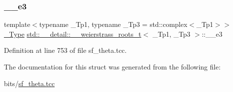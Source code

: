 \subsubsection{\texorpdfstring{\+\_\+\+\_\+e3}{\_\_e3}}
{\footnotesize\ttfamily template$<$typename \+\_\+\+Tp1, typename \+\_\+\+Tp3 = std\+::complex$<$\+\_\+\+Tp1$>$$>$ \\
\hyperlink{structstd_1_1____detail_1_1____weierstrass__roots__t_acda3e0386962aea322dea870977b67ed}{\+\_\+\+Type} \hyperlink{structstd_1_1____detail_1_1____weierstrass__roots__t}{std\+::\+\_\+\+\_\+detail\+::\+\_\+\+\_\+weierstrass\+\_\+roots\+\_\+t}$<$ \+\_\+\+Tp1, \+\_\+\+Tp3 $>$\+::\+\_\+\+\_\+e3}



Definition at line 753 of file sf\+\_\+theta.\+tcc.



The documentation for this struct was generated from the following file\+:\begin{DoxyCompactItemize}
\item 
bits/\hyperlink{sf__theta_8tcc}{sf\+\_\+theta.\+tcc}\end{DoxyCompactItemize}
